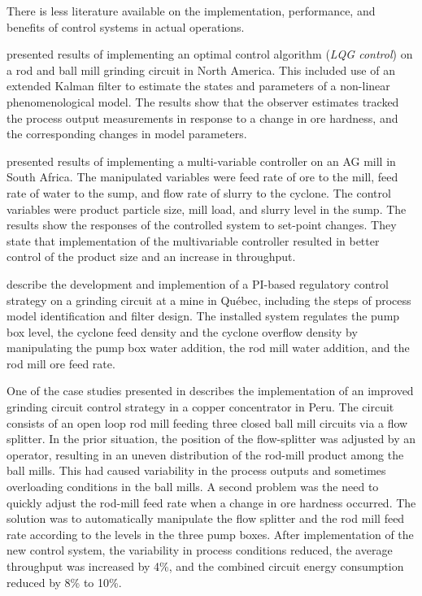 There is less literature available on the implementation, performance, and benefits of control systems in actual operations.

\cite{herbst_optimal_1988} presented results of implementing an optimal control algorithm (\textit{LQG control}) on a rod and ball mill grinding circuit in North America. This included use of an extended Kalman filter to estimate the states and parameters of a non-linear phenomenological model. The results show that the observer estimates tracked the process output measurements in response to a change in ore hardness, and the corresponding changes in model parameters.

\cite{hulbert_multivariable_1990} presented results of implementing a multi-variable controller on an AG mill in South Africa. The manipulated variables were feed rate of ore to the mill, feed rate of water to the sump, and flow rate of slurry to the cyclone. The control variables were product particle size, mill load, and slurry level in the sump. The results show the responses of the controlled system to set-point changes. They state that implementation of the multivariable controller resulted in better control of the product size and an increase in throughput.

\cite{desbiens_distributed_1997} describe the development and implemention of a PI-based regulatory control strategy on a grinding circuit at a mine in Qu\'ebec, including the steps of process model identification and filter design. The installed system regulates the pump box level, the cyclone feed density and the cyclone overflow density by manipulating the pump box water addition, the rod mill water addition, and the rod mill ore feed rate. 

One of the case studies presented in \cite{desbiens_using_2008} describes the implementation of an improved grinding circuit control strategy in a copper concentrator in Peru. The circuit consists of an open loop rod mill feeding three closed ball mill circuits via a flow splitter. In the prior situation, the position of the flow-splitter was adjusted by an operator, resulting in an uneven distribution of the rod-mill product among the ball mills. This had caused variability in the process outputs and sometimes overloading conditions in the ball mills. A second problem was the need to quickly adjust the rod-mill feed rate when a change in ore hardness occurred. The solution was to automatically manipulate the flow splitter and the rod mill feed rate according to the levels in the three pump boxes. After implementation of the new control system, the variability in process conditions reduced, the average throughput was increased by 4\%, and the combined circuit energy consumption reduced by 8\% to 10\%.

